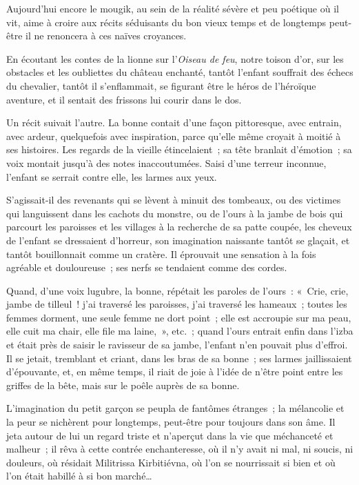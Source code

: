 \documentclass[french,twoside]{book} %
\begin{document}
Aujourd’hui encore le mougik, au sein de la réalité sévère et peu poétique où il vit, aime à croire aux récits séduisants du bon vieux temps et de longtemps peut-être il ne renoncera à ces naïves croyances.\par
En écoutant les contes de la lionne sur l’\emph{Oiseau de feu}, notre toison d’or, sur les obstacles et les oubliettes du château enchanté, tantôt l’enfant souffrait des échecs du chevalier, tantôt il s’enflammait, se figurant être le héros de l’héroïque aventure, et il sentait des frissons lui courir dans le dos.\par
Un récit suivait l’autre. La bonne contait d’une façon pittoresque, avec entrain, avec ardeur, quelquefois avec inspiration, parce qu’elle même croyait à moitié à ses histoires. Les regards de la vieille étincelaient ; sa tête branlait d’émotion ; sa voix montait jusqu’à des notes inaccoutumées. Saisi d’une terreur inconnue, l’enfant se serrait contre elle, les larmes aux yeux.\par
S’agissait-il des revenants qui se lèvent à minuit des tombeaux, ou des victimes qui languissent dans les cachots du monstre, ou de l’ours à la jambe de bois qui parcourt les paroisses et les villages à la recherche de sa patte coupée, les cheveux de l’enfant se dressaient d’horreur, son imagination naissante tantôt se glaçait, et tantôt bouillonnait comme un cratère. Il éprouvait une sensation à la fois agréable et douloureuse ; ses nerfs se tendaient comme des cordes.\par
Quand, d’une voix lugubre, la bonne, répétait les paroles de l’ours : « Crie, crie, jambe de tilleul ! j’ai traversé les paroisses, j’ai traversé les hameaux ; toutes les femmes dorment, une seule femme ne dort point ; elle est accroupie sur ma peau, elle cuit ma chair, elle file ma laine, », etc. ; quand l’ours entrait enfin dans l’izba et était près de saisir le ravisseur de sa jambe, l’enfant n’en pouvait plus d’effroi. Il se jetait, tremblant et criant, dans les bras de sa bonne ; ses larmes jaillissaient d’épouvante, et, en même temps, il riait de joie à l’idée de n’être point entre les griffes de la bête, mais sur le poêle auprès de sa bonne.\par
L’imagination du petit garçon se peupla de fantômes étranges ; la mélancolie et la peur se nichèrent pour longtemps, peut-être pour toujours dans son âme. Il jeta autour de lui un regard triste et n’aperçut dans la vie que méchanceté et malheur ; il rêva à cette contrée enchanteresse, où il n’y avait ni mal, ni soucis, ni douleurs, où résidait Militrissa Kirbitiévna, où l’on se nourrissait si bien et où l’on était habillé à si bon marché…\par
\end{document}
